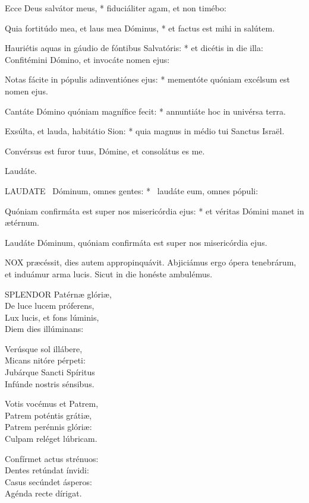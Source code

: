 Ecce Deus salvátor meus, * fiduciáliter agam, et non timébo:

Quia fortitúdo mea, et laus mea Dóminus, * et factus est mihi in salútem.

Hauriétis aquas in gáudio de fóntibus Salvatóris: * et dicétis in die illa: Confitémini Dómino, et invocáte nomen ejus:

Notas fácite in pópulis adinventiónes ejus: * mementóte quóniam excélsum est nomen ejus.

Cantáte Dómino quóniam magnífice fecit: * annuntiáte hoc in univérsa terra.

Exsúlta, et lauda, habitátio Sion: * quia magnus in médio tui Sanctus Israël.

 Convérsus est furor tuus, Dómine, et consolátus es me.

 Laudáte. \textdagger


\lettrine[lines=2]{L}{AUDATE} \textdagger\ Dóminum, omnes gentes: * \textdaggerdbl\ laudáte eum, omnes pópuli:

Quóniam confirmáta est super nos misericórdia ejus: * et véritas Dómini manet in ætérnum.

 Laudáte Dóminum, quóniam confirmáta est super nos misericórdia ejus.


\lettrine[lines=2]{N}{OX} præcéssit, dies autem appropinquávit. Abjiciámus ergo ópera tenebrárum, et induámur arma lucis. Sicut in die honéste ambulémus.


\lettrine[lines=2]{S}{PLENDOR} Patérnæ glóriæ,\\
De luce lucem próferens,\\
Lux lucis, et fons lúminis,\\
Diem dies illúminans:

Verúsque sol illábere,\\
Micans nitóre pérpeti:\\
Jubárque Sancti Spíritus\\
Infúnde nostris sénsibus.

Votis vocémus et Patrem,\\
Patrem poténtis grátiæ,\\
Patrem perénnis glóriæ:\\
Culpam reléget lúbricam.

Confírmet actus strénuos:\\
Dentes retúndat ínvidi:\\
Casus secúndet ásperos:\\
Agénda recte dírigat.

